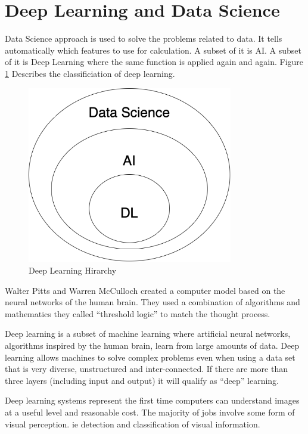 \section{Deep Learning and Data Science}

Data Science approach is used to solve the problems related to data. It tells automatically which features to use for calculation. A subset of it is AI. A subset of it is Deep Learning where the same function is applied again and again. Figure \ref{fig:deeplearning} Describes the classificiation of deep learning.


\begin{figure}[ht]
	\centering
	\includegraphics[width=0.8\textwidth]{images/deep-learning}
	\caption{Deep Learning Hirarchy}
	\label{fig:deeplearning}
\end{figure}


Walter Pitts and Warren McCulloch created a computer model based on the neural networks of the human brain\cite{13}. They used a combination of algorithms and mathematics they called “threshold logic” to match the thought process.

Deep learning is a subset of machine learning where artificial neural networks, algorithms inspired by the human brain, learn from large amounts of data\cite{14}. Deep learning allows machines to solve complex problems even when using a data set that is very diverse, unstructured and inter-connected. If there are more than three layers (including input and output) it will qualify as “deep” learning.

Deep learning systems represent the first time computers can understand images at a useful level and reasonable cost. The majority of jobs involve some form of visual perception. ie detection and classification of visual information.

